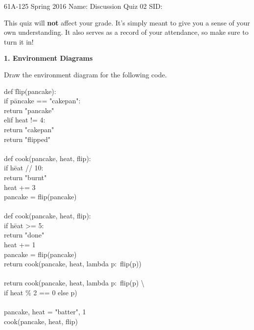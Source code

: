 \documentclass[12pt]{article}
\newenvironment{courier}{\fontfamily{pcr}\selectfont}{\par}
\newenvironment{modern}{\fontfamily{cmr}\selectfont}{\par}
\begin{document}
\begin{modern}
61A-125 Spring 2016 \hfill{Name:} {\underline {\hspace{2.5in}}}\newline
Discussion Quiz 02 \hfill{SID:} {\underline {\hspace{2.5in}}}\newline

This quiz will \textbf{not} affect your grade. It's simply meant to give you a sense of your own understanding. It also serves as a record of your attendance, so make sure to turn it in!\newline
\end{modern}

\begin{modern}
\textbf{1. Environment Diagrams}

Draw the environment diagram for the following code.
\end{modern}

\begin{courier}
\begin{tabbing}
def \=flip(pancake): \\
\> if p\=ancake == "cakepan": \\
\> \> return "pancake" \\
\> elif heat != 4: \\
\> \> return "cakepan" \\
\> return "flipped" \\ \\

def cook(pancake, heat, flip): \\
\> if h\=eat // 10: \\
\> \> return "burnt" \\
\> heat += 3 \\
\> pancake = flip(pancake) \\ \\

\> def cook(pancake, heat, flip): \\
\> \> if h\=eat >= 5: \\
\> \> \> return "done" \\
\> \> heat += 1 \\
\> \> pancake = flip(pancake) \\
\> \> return cook(pancake, heat, lambda p:\ flip(p)) \\ \\

\> return cook(pancake, heat, lambda p:\ flip(p) \textbackslash \\
\> \> \> if heat \% 2 == 0 else p) \\ \\

pancake, heat = "batter", 1 \\
cook(pancake, heat, flip) \\
\end{tabbing}
\end{courier}
\end{document}
